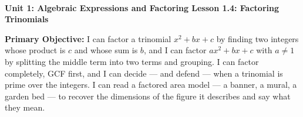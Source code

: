 \documentclass[10pt]{article}
\newcommand{\UnitNumberName}{Unit 1: Algebraic Expressions and Factoring \quad}
\newcommand{\LessonNumberName}{Lesson 1.4: Factoring Trinomials}
\begin{document}
\begin{center}
    {\Large\bfseries \CourseName \\
    {\small\bfseries \UnitNumberName \LessonNumberName}}
\end{center}

\begin{tcolorbox}[colback=mist, colframe=royal, boxrule=0.9pt, arc=2mm,
    left=2mm, right=2mm, top=1.5mm, bottom=1.5mm]
    \textbf{Primary Objective:} I can factor a trinomial $x^2+bx+c$ by finding two integers whose
    product is $c$ and whose sum is $b$, and I can factor $ax^2+bx+c$ with $a \ne 1$ by splitting
    the middle term into two terms and grouping. I can factor completely, GCF first, and I can
    decide --- and defend --- when a trinomial is prime over the integers. I can read a factored
    area model --- a banner, a mural, a garden bed --- to recover the dimensions of the figure it
    describes and say what they mean.
\end{tcolorbox}
\end{document}
